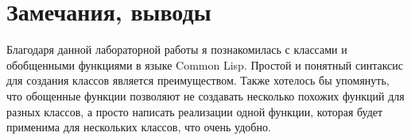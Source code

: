 \documentclass[12pt]{article}
\begin{document}
\section{Замечания, выводы}
Благодаря данной лабораторной работы я познакомилась с классами и обобщенными функциями в языке Common Lisp. Простой и понятный синтаксис для создания классов является преимуществом. Также хотелось бы упомянуть, что обощенные функции позволяют не создавать несколько похожих функций для разных классов, а просто написать реализации одной функции, которая будет применима для нескольких классов, что очень удобно.
\end{document}
